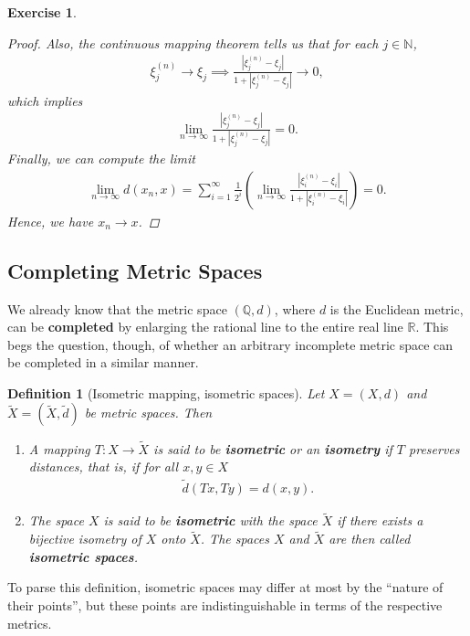 \documentclass[11pt]{article}
\theoremstyle{mystyle}
\newtheorem{defn}{Definition}[section]
\newtheorem{protoexer}{Exercise}[section]
\newenvironment{exer}
{\colorlet{shadecolor}{blue!15}\begin{shaded}\begin{protoexer}}
{\end{protoexer}\end{shaded}}
\newcommand{\0}{\mathbf{0}}
\begin{document}
\begin{exer}
\begin{proof}
Also, the continuous mapping theorem tells us that for each $j \in \mathbb{N}$,
\begin{align*}
    \xi_j^{(n)} \longrightarrow \xi_j \implies \frac{|\xi_j^{(n)} - \xi_j|}{1 + |\xi_j^{(n)}- \xi_j|} \longrightarrow 0,
\end{align*}
which implies
\begin{align*}
    \lim_{n \to \infty} \frac{|\xi_j^{(n)} - \xi_j|}{1 + |\xi_j^{(n)}- \xi_j|} = 0.
\end{align*}
Finally, we can compute the limit
\begin{align*}
    \lim_{n \to \infty} d(x_n, x) = \sum_{i=1}^{\infty} \frac{1}{2^i} \left( \lim_{n \to \infty}\frac{|\xi_i^{(n)} - \xi_i|}{1 + |\xi_i^{(n)} - \xi_i|} \right) = 0. 
\end{align*}
Hence, we have $x_n \longrightarrow x$.
\end{proof}
\end{exer}

\subsection{Completing Metric Spaces}\label{completingmetric}
We already know that the metric space $(\mathbb{Q}, d)$, where $d$ is the Euclidean metric, can be \textbf{completed} by enlarging the rational line to the entire real line $\mathbb{R}$. This begs the question, though, of whether an arbitrary incomplete metric space can be completed in a similar manner.

\begin{defn}[Isometric mapping, isometric spaces]
Let $X = (X, d)$ and $\tilde{X} = (\tilde{X}, \tilde{d})$ be metric spaces. Then
\begin{enumerate}
    \item A mapping $T: X \longrightarrow \tilde{X}$ is said to be \textbf{isometric} or an \textbf{isometry} if $T$ preserves distances, that is, if for all $x, y \in X$
    \begin{align*}
        \tilde{d}(Tx, Ty) = d(x, y).
    \end{align*}
    \item The space $X$ is said to be \textbf{isometric} with the space $\tilde{X}$ if there exists a bijective isometry of $X$ onto $\tilde{X}$. The spaces $X$ and $\tilde{X}$ are then called \textbf{isometric spaces}.
\end{enumerate}
\end{defn}
To parse this definition, isometric spaces may differ at most by the \enquote{nature of their points}, but these points are indistinguishable in terms of the respective metrics. 
\end{document}
